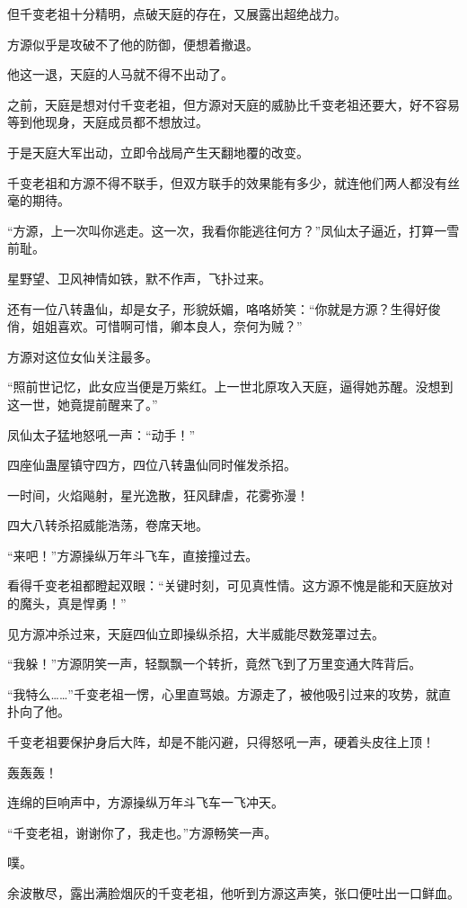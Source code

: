 \begin{this_body}
但千变老祖十分精明，点破天庭的存在，又展露出超绝战力。

方源似乎是攻破不了他的防御，便想着撤退。

他这一退，天庭的人马就不得不出动了。

之前，天庭是想对付千变老祖，但方源对天庭的威胁比千变老祖还要大，好不容易等到他现身，天庭成员都不想放过。

于是天庭大军出动，立即令战局产生天翻地覆的改变。

千变老祖和方源不得不联手，但双方联手的效果能有多少，就连他们两人都没有丝毫的期待。

“方源，上一次叫你逃走。这一次，我看你能逃往何方？”凤仙太子逼近，打算一雪前耻。

星野望、卫风神情如铁，默不作声，飞扑过来。

还有一位八转蛊仙，却是女子，形貌妖媚，咯咯娇笑：“你就是方源？生得好俊俏，姐姐喜欢。可惜啊可惜，卿本良人，奈何为贼？”

方源对这位女仙关注最多。

“照前世记忆，此女应当便是万紫红。上一世北原攻入天庭，逼得她苏醒。没想到这一世，她竟提前醒来了。”

凤仙太子猛地怒吼一声：“动手！”

四座仙蛊屋镇守四方，四位八转蛊仙同时催发杀招。

一时间，火焰飚射，星光逸散，狂风肆虐，花雾弥漫！

四大八转杀招威能浩荡，卷席天地。

“来吧！”方源操纵万年斗飞车，直接撞过去。

看得千变老祖都瞪起双眼：“关键时刻，可见真性情。这方源不愧是能和天庭放对的魔头，真是悍勇！”

见方源冲杀过来，天庭四仙立即操纵杀招，大半威能尽数笼罩过去。

“我躲！”方源阴笑一声，轻飘飘一个转折，竟然飞到了万里变通大阵背后。

“我特么……”千变老祖一愣，心里直骂娘。方源走了，被他吸引过来的攻势，就直扑向了他。

千变老祖要保护身后大阵，却是不能闪避，只得怒吼一声，硬着头皮往上顶！

轰轰轰！

连绵的巨响声中，方源操纵万年斗飞车一飞冲天。

“千变老祖，谢谢你了，我走也。”方源畅笑一声。

噗。

余波散尽，露出满脸烟灰的千变老祖，他听到方源这声笑，张口便吐出一口鲜血。

\end{this_body}

